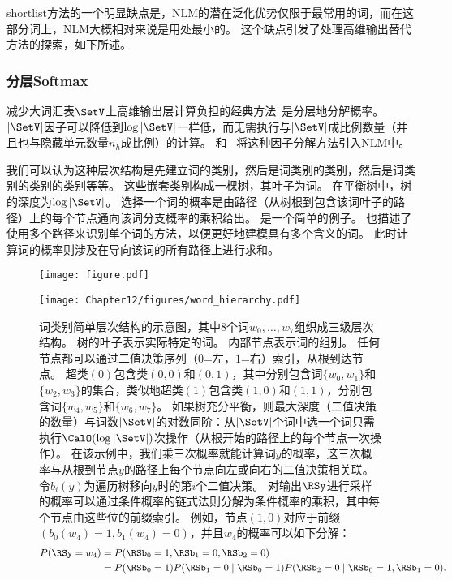 \gls{shortlist}方法的一个明显缺点是，\gls{NLM}的潜在泛化优势仅限于最常用的词，而在这部分词上，\gls{NLM}大概相对来说是用处最小的。
这个缺点引发了处理高维输出替代方法的探索，如下所述。

\subsubsection{分层Softmax}
减少大词汇表$\SetV$上高维输出层计算负担的经典方法~\citep{Goodman2001}是分层地分解概率。
$|\SetV|$因子可以降低到$\log |\SetV|$一样低，而无需执行与$|\SetV|$成比例数量（并且也与隐藏单元数量$n_h$成比例）的计算。
\citet{BengioTR1215}和~\citet{Morin+Bengio-2005-small} 将这种因子分解方法引入\gls{NLM}中。


我们可以认为这种层次结构是先建立词的类别，然后是词类别的类别，然后是词类别的类别的类别等等。
这些嵌套类别构成一棵树，其叶子为词。
在平衡树中，树的深度为$\log |\SetV|$。
选择一个词的概率是由路径（从树根到包含该词叶子的路径）上的每个节点通向该词分支概率的乘积给出。
是一个简单的例子。
\citet{Mnih+Hinton-2009}也描述了使用多个路径来识别单个词的方法，以便更好地建模具有多个含义的词。
此时计算词的概率则涉及在导向该词的所有路径上进行求和。
\begin{figure}[htp]
\centering
\ifOpenSource
\centerline{\texttt{[image: figure.pdf]}}
\else
\texttt{[image: Chapter12/figures/word\_hierarchy.pdf]}
\fi
\captionsetup{singlelinecheck=off}
\caption[.]{词类别简单层次结构的示意图，其中8个词$w_0,\dots,w_7$组织成三级层次结构。
树的叶子表示实际特定的词。
内部节点表示词的组别。
任何节点都可以通过二值决策序列（$0$=左，$1$=右）索引，从根到达节点。
超类$(0)$包含类$(0,0)$和$(0,1)$，其中分别包含词$\{w_0,w_1\}$和$\{w_2,w_3\}$的集合，类似地超类$(1)$包含类$(1,0)$和$(1,1)$，分别包含词$\{w_4,w_5\}$和$\{w_6,w_7\}$。
如果树充分平衡，则最大深度（二值决策的数量）与词数$| \SetV |$的对数同阶：从$| \SetV |$个词中选一个词只需执行$\CalO(\log |\SetV|)$次操作（从根开始的路径上的每个节点一次操作）。
在该示例中，我们乘三次概率就能计算词$y$的概率，这三次概率与从根到节点$y$的路径上每个节点向左或向右的二值决策相关联。
令$b_i(y)$为遍历树移向$y$时的第$i$个二值决策。
对输出$\RSy$进行采样的概率可以通过条件概率的链式法则分解为条件概率的乘积，其中每个节点由这些位的前缀索引。
例如，节点$(1,0)$对应于前缀$(b_0(w_4)=1, b_1(w_4)=0)$，并且$w_4$的概率可以如下分解：
\begin{align}
  P(\RSy = w_4) &= P(\RSb_0 = 1, \RSb_1 = 0, \RSb_2 = 0) \\
    &= P(\RSb_0 = 1) P(\RSb_1 = 0 \mid \RSb_0 = 1) P(\RSb_2 = 0 \mid \RSb_0 = 1, \RSb_1 = 0). 
\end{align}
}
\label{fig:chap12_word_hierarchy}
\end{figure}

